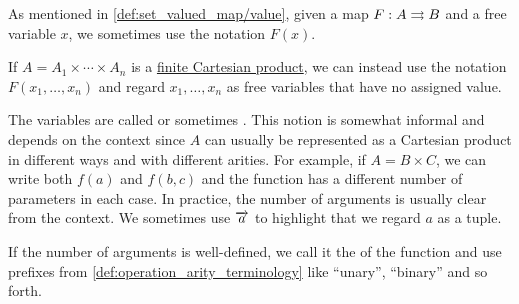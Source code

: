 \begin{concept}\label{con:function_arguments}
  As mentioned in \cref{def:set_valued_map/value}, given a map \( F: A \rightrightarrows B \) and a free variable \( x \), we sometimes use the notation \( F(x) \).

  If \( A = A_1 \times \cdots \times A_n \) is a \hyperref[def:cartesian_product]{finite Cartesian product}, we can instead use the notation \( F(x_1, \ldots, x_n) \) and regard \( x_1, \ldots, x_n \) as free variables that have no assigned value.

  The variables are called  or sometimes . This notion is somewhat informal and depends on the context since \( A \) can usually be represented as a Cartesian product in different ways and with different arities. For example, if \( A = B \times C \), we can write both \( f(a) \) and \( f(b, c) \) and the function has a different number of parameters in each case. In practice, the number of arguments is usually clear from the context. We sometimes use \( \overrightarrow{a} \) to highlight that we regard \( a \) as a tuple.

  If the number of arguments is well-defined, we call it the  of the function and use prefixes from \cref{def:operation_arity_terminology} like \enquote{unary}, \enquote{binary} and so forth.
\end{concept}

